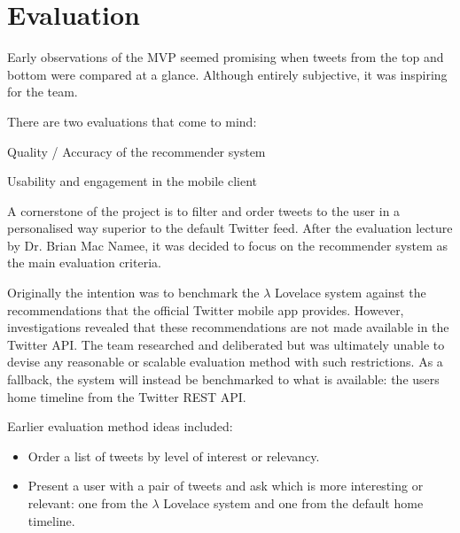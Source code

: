 \documentclass{article}
\begin{document}
\newpage


\section{Evaluation}
%
%
%
Early observations of the MVP seemed promising when tweets from the top and bottom were compared at a glance. Although entirely subjective, it was inspiring for the team.
\\

\begin{samepage}
\noindent There are two evaluations that come to mind:

\begin{itemize*}
	\item Quality / Accuracy of the recommender system
	\item Usability and engagement in the mobile client
\end{itemize*}
\end{samepage}

\noindent A cornerstone of the project is to filter and order tweets to the user in a personalised way superior to the default Twitter feed. After the evaluation lecture by Dr. Brian Mac Namee, it was decided to focus on the recommender system as the main evaluation criteria.

Originally the intention was to benchmark the $\lambda$ Lovelace system against the recommendations that the official Twitter mobile app provides. However, investigations revealed that these recommendations are not made available in the Twitter API. The team researched and deliberated but was ultimately unable to devise any reasonable or scalable evaluation method with such restrictions. As a fallback, the system will instead be benchmarked to what is available: the users home timeline from the Twitter REST API.
\\

\begin{samepage}
\noindent Earlier evaluation method ideas included: 

\begin{itemize}
    \item Order a list of tweets by level of interest or relevancy.
    \item Present a user with a pair of tweets and ask which is more interesting or relevant: one from the $\lambda$ Lovelace system and one from the default home timeline.
\end{itemize}
\end{samepage}
\end{document}
